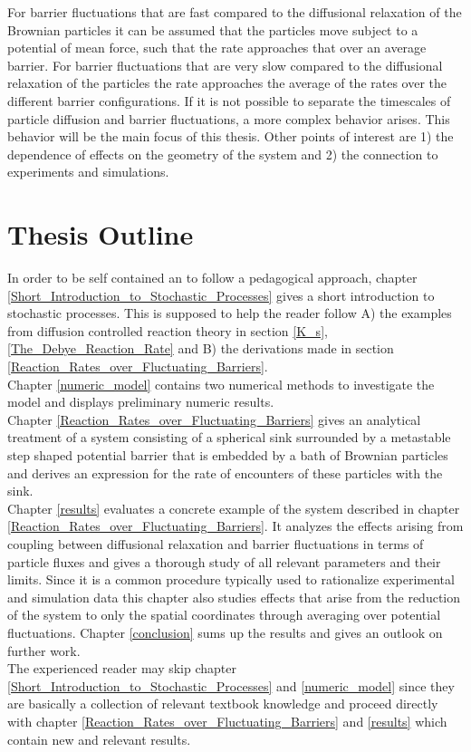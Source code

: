 For barrier fluctuations that are fast compared to the diffusional relaxation of the Brownian particles it can be assumed that the particles move subject to a potential of mean force, such that the rate approaches that over an average barrier. For barrier fluctuations that are very slow compared to the diffusional relaxation of the particles the rate approaches the average of the rates over the different barrier configurations.
If it is not possible to separate the timescales of particle diffusion and barrier fluctuations, a more complex behavior arises. This behavior will be the main focus of this thesis. 
Other points of interest are 1) the dependence of effects on the geometry of the system and 2) the connection to experiments and simulations.

\section{Thesis Outline}
In order to be self contained an to follow a pedagogical approach, chapter \ref{Short_Introduction_to_Stochastic_Processes} gives a short introduction to stochastic processes. This is supposed to help the reader follow A) the examples from diffusion controlled reaction theory in section \ref{K_s}, \ref{The_Debye_Reaction_Rate} and B) the derivations made in section \ref{Reaction_Rates_over_Fluctuating_Barriers}. \\
Chapter \ref{numeric_model} contains two numerical methods to investigate the model and displays preliminary numeric results. \\
Chapter \ref{Reaction_Rates_over_Fluctuating_Barriers} gives an analytical treatment of a system consisting of a spherical sink surrounded by a metastable step shaped potential barrier that is embedded by a bath of Brownian particles and derives an expression for the rate of encounters of these particles with the sink. \\
Chapter \ref{results} evaluates a concrete example of the system described in chapter \ref{Reaction_Rates_over_Fluctuating_Barriers}. It analyzes the effects arising from coupling between diffusional relaxation and barrier fluctuations in terms of particle fluxes and gives a thorough study of all relevant parameters and their limits. Since it is a common procedure typically used to rationalize experimental and simulation data this chapter also studies effects that arise from the reduction of the system to only the spatial coordinates through averaging over potential fluctuations. Chapter \ref{conclusion} sums up the results and gives an outlook on further work. \\

The experienced reader may skip chapter \ref{Short_Introduction_to_Stochastic_Processes} and \ref{numeric_model} since they are basically a collection of relevant textbook knowledge and proceed directly with chapter \ref{Reaction_Rates_over_Fluctuating_Barriers} and \ref{results} which contain new and relevant results. 
